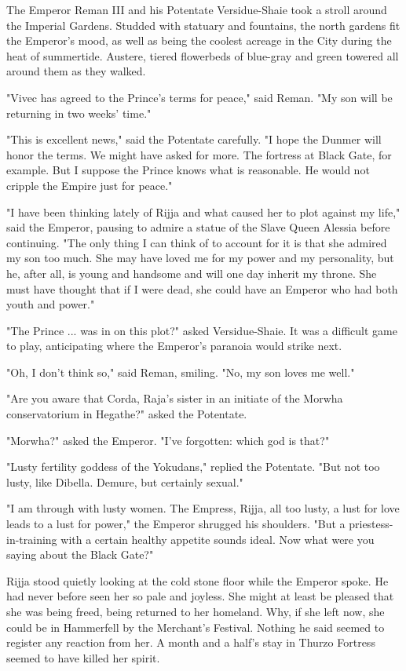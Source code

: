 \clearpage
{}

\dropcap The Emperor Reman III and his Potentate Versidue-Shaie took a stroll around the Imperial Gardens. Studded with statuary and fountains, the north gardens fit the Emperor's mood, as well as being the coolest acreage in the City during the heat of summertide. Austere, tiered flowerbeds of blue-gray and green towered all around them as they walked.

"Vivec has agreed to the Prince's terms for peace," said Reman. "My son will be returning in two weeks' time."

"This is excellent news," said the Potentate carefully. "I hope the Dunmer will honor the terms. We might have asked for more. The fortress at Black Gate, for example. But I suppose the Prince knows what is reasonable. He would not cripple the Empire just for peace."

"I have been thinking lately of Rijja and what caused her to plot against my life," said the Emperor, pausing to admire a statue of the Slave Queen Alessia before continuing. "The only thing I can think of to account for it is that she admired my son too much. She may have loved me for my power and my personality, but he, after all, is young and handsome and will one day inherit my throne. She must have thought that if I were dead, she could have an Emperor who had both youth and power."

"The Prince ... was in on this plot?" asked Versidue-Shaie. It was a difficult game to play, anticipating where the Emperor's paranoia would strike next.

"Oh, I don't think so," said Reman, smiling. "No, my son loves me well."

"Are you aware that Corda, Raja's sister in an initiate of the Morwha conservatorium in Hegathe?" asked the Potentate.

"Morwha?" asked the Emperor. "I've forgotten: which god is that?"

"Lusty fertility goddess of the Yokudans," replied the Potentate. "But not too lusty, like Dibella. Demure, but certainly sexual."

"I am through with lusty women. The Empress, Rijja, all too lusty, a lust for love leads to a lust for power," the Emperor shrugged his shoulders. "But a priestess-in-training with a certain healthy appetite sounds ideal. Now what were you saying about the Black Gate?"

Rijja stood quietly looking at the cold stone floor while the Emperor spoke. He had never before seen her so pale and joyless. She might at least be pleased that she was being freed, being returned to her homeland. Why, if she left now, she could be in Hammerfell by the Merchant's Festival. Nothing he said seemed to register any reaction from her. A month and a half's stay in Thurzo Fortress seemed to have killed her spirit.

